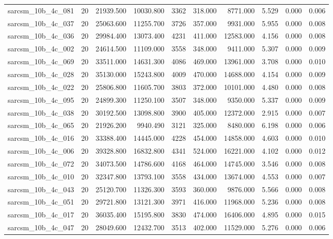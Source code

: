 \begin{tabular}{lrrrrrrrrr}
sarcsm\_10b\_4c\_081 & 20 & 21939.500 & 10030.800 & 3362 & 318.000 & 8771.000 & 5.529 & 0.000 & 0.006 \\
sarcsm\_10b\_4c\_037 & 20 & 25063.600 & 11255.700 & 3726 & 357.000 & 9931.000 & 5.955 & 0.000 & 0.008 \\
sarcsm\_10b\_4c\_036 & 20 & 29984.400 & 13073.400 & 4231 & 411.000 & 12583.000 & 4.156 & 0.000 & 0.008 \\
sarcsm\_10b\_4c\_002 & 20 & 24614.500 & 11109.000 & 3558 & 348.000 & 9411.000 & 5.307 & 0.000 & 0.009 \\
sarcsm\_10b\_4c\_069 & 20 & 33511.000 & 14631.300 & 4086 & 469.000 & 13961.000 & 3.708 & 0.000 & 0.010 \\
sarcsm\_10b\_4c\_028 & 20 & 35130.000 & 15243.800 & 4009 & 470.000 & 14688.000 & 4.154 & 0.000 & 0.009 \\
sarcsm\_10b\_4c\_022 & 20 & 25806.800 & 11605.700 & 3803 & 372.000 & 10101.000 & 4.480 & 0.000 & 0.008 \\
sarcsm\_10b\_4c\_095 & 20 & 24899.300 & 11250.100 & 3507 & 348.000 & 9350.000 & 5.337 & 0.000 & 0.009 \\
sarcsm\_10b\_4c\_038 & 20 & 30192.500 & 13098.800 & 3900 & 405.000 & 12372.000 & 2.915 & 0.000 & 0.007 \\
sarcsm\_10b\_4c\_065 & 20 & 21926.200 & 9940.490 & 3121 & 325.000 & 8480.000 & 6.198 & 0.000 & 0.006 \\
sarcsm\_10b\_4c\_016 & 20 & 33388.400 & 14445.000 & 4228 & 454.000 & 14858.000 & 4.603 & 0.000 & 0.010 \\
sarcsm\_10b\_4c\_006 & 20 & 39328.800 & 16832.800 & 4341 & 524.000 & 16221.000 & 4.102 & 0.000 & 0.012 \\
sarcsm\_10b\_4c\_072 & 20 & 34073.500 & 14786.600 & 4168 & 464.000 & 14745.000 & 3.546 & 0.000 & 0.008 \\
sarcsm\_10b\_4c\_010 & 20 & 32347.800 & 13793.100 & 3558 & 434.000 & 13674.000 & 4.553 & 0.000 & 0.007 \\
sarcsm\_10b\_4c\_043 & 20 & 25120.700 & 11326.300 & 3593 & 360.000 & 9876.000 & 5.566 & 0.000 & 0.008 \\
sarcsm\_10b\_4c\_051 & 20 & 29721.800 & 13121.300 & 3971 & 416.000 & 11968.000 & 5.236 & 0.000 & 0.008 \\
sarcsm\_10b\_4c\_017 & 20 & 36035.400 & 15195.800 & 3830 & 474.000 & 16406.000 & 4.895 & 0.000 & 0.015 \\
sarcsm\_10b\_4c\_047 & 20 & 28049.600 & 12432.700 & 3513 & 402.000 & 11529.000 & 5.276 & 0.000 & 0.006 \\

\end{tabular}
